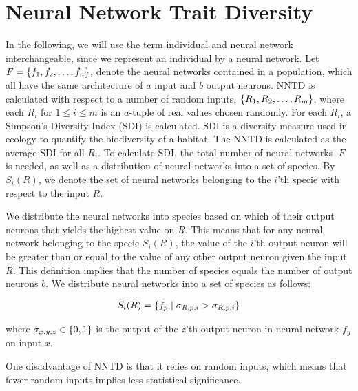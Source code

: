 \section{Neural Network Trait Diversity}
In the following, we will use the term individual and neural network interchangeable, since we represent an individual by a neural network.  Let $F = \{ f_1, f_2, \dots, f_n \}$, denote the neural networks contained in a population, which all have the same architecture of $a$ input and $b$ output neurons.
NNTD is calculated with respect to a number of random inputs, $\{ R_1, R_2, \dots, R_m \}$, where each $R_i$ for $1 \leq i \leq m$ is an $a$-tuple of real values chosen randomly.
For each $R_i$, a Simpson's Diversity Index (SDI) is calculated.
SDI is a diversity measure used in ecology to quantify the biodiversity of a habitat. 
The NNTD is calculated as the average SDI for all $R_i$.
To calculate SDI, the total number of neural networks $\lvert F \lvert$ is needed, as well as a distribution of neural networks into a set of species. By $S_i(R)$, we denote the set of neural networks belonging to the $i$'th specie with respect to the input $R$.

We distribute the neural networks into species based on which of their output neurons that yields the highest value on $R$. This means that for any neural network belonging to the specie $S_i(R)$, the value of the $i$'th output neuron will be greater than or equal to the value of any other output neuron given the input $R$. 
This definition implies that the number of species equals the number of output neurons $b$. 
We distribute neural networks into a set of species as follows:

\begin{equation*}\label{eq:species}
  \begin{split}
    S_i(R) = \{ f_p \mid \sigma_{R,p,i} > \sigma_{R,p,i} \}
  \end{split}
\end{equation*}

where $\sigma_{x ,y, z} \in \{ 0, 1 \}$ is the output of the $z$'th output neuron in neural network $f_y$ on input $x$.

One disadvantage of NNTD is that it relies on random inputs, which means that fewer random inputs implies less statistical significance.